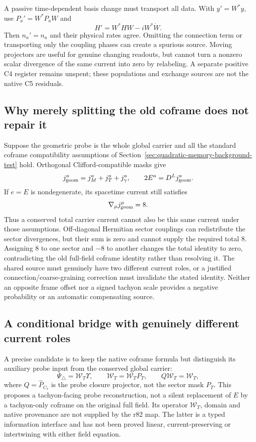 \documentclass[11pt,a4paper]{article}
\begin{document}
A passive time-dependent basis change must transport all data. With
$y'=W^*y$, use $P_a'=W^*P_aW$ and
\[
 H'=W^*HW-iW^*\dot W.
\]
Then $n_a'=n_a$ and their physical rates agree. Omitting the connection
term or transporting only the coupling phases can create a spurious
source. Moving projectors are useful for genuine changing readouts,
but cannot turn a nonzero scalar divergence of the same current into
zero by relabeling. A separate positive C4 register remains unspent;
these populations and exchange sources are not the native C5 residuals.

\subsection{Why merely splitting the old coframe does not repair it}
Suppose the geometric probe is the whole global carrier and all the
standard coframe compatibility assumptions of
Section~\ref{sec:quadratic-memory-background-test} hold. Orthogonal
Clifford-compatible masks give
\[
 j_{\rm geom}^a=j_M^a+j_T^a+j_\gamma^a,
 \qquad 2E^a=D^Lj_{\rm geom}^a.
\]
If $e=E$ is nondegenerate, its spacetime current still satisfies
\[
 \nabla_\mu j_{\rm geom}^\mu=8.
\]
Thus a conserved total carrier current cannot also be this same current
under those assumptions. Off-diagonal Hermitian sector couplings can
redistribute the sector divergences, but their sum is zero and cannot
supply the required total $8$. Assigning $8$ to one sector and $-8$ to
another changes the total identity to zero, contradicting the old
full-field coframe identity rather than resolving it. The shared
source must genuinely have two different current roles, or a justified
connection/coarse-graining correction must invalidate the stated
identity. Neither an opposite frame offset nor a signed tachyon scale
provides a negative probability or an automatic compensating source.

\subsection{A conditional bridge with genuinely different current roles}
A precise candidate is to keep the native coframe formula but distinguish
its auxiliary probe input from the conserved global carrier:
\[
 \Psi_\triangle=\mathcal W_T\Upsilon,\qquad
 \mathcal W_T=\mathcal W_TP_T,\qquad
 Q\mathcal W_T=\mathcal W_T,
\]
where $Q=\hat P_{C_7}$ is the probe closure projector, not the sector
mask $P_T$. This proposes a tachyon-facing probe reconstruction, not
a silent replacement of $E$ by a tachyon-only coframe on the original
full field. Its operator $\mathcal W_T$, domain and native provenance
are not supplied by the r82 map. The latter is a typed information
interface and has not been proved linear, current-preserving or
intertwining with either field equation.
\end{document}
